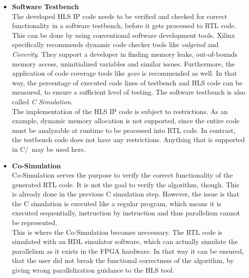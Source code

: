 \begin{itemize}
  \item \textbf{Software Testbench}\\
      The developed HLS IP code needs to be verified and checked for correct functionality in a software testbench, before it gets processed to RTL code.
      This can be done by using conventional software development tools.
      Xilinx specifically recommends dynamic code checker tools like \textit{valgrind} and \textit{Coverity}.
      They support a developer in finding memory leaks, out-of-bounds memory access, uninitialized variables and similar issues.
      Furthermore, the application of code coverage tools like \textit{gcov} is recommended as well.
      In that way, the percentage of executed code lines of testbench and HLS code can be measured, to ensure a sufficient level of testing.
      The software testbench is also called \textit{C Simulation}.\\

      The implementation of the HLS IP code is subject to restrictions.
      As an example, dynamic memory allocation is not supported, since the entire code must be analyzable at runtime to be processed into RTL code.
      In contrast, the testbench code does not have any restrictions.
      Anything that is supported in C/\cplusplus\ may be used here.\\

  \item \textbf{Co-Simulation}\\
      Co-Simulation serves the purpose to verify the correct functionality of the generated RTL code.
      It is not the goal to verify the algorithm, though.
      This is already done in the previous C simulation step.
      However, the issue is that the C simulation is executed like a regular program, which means it is executed sequentially, instruction by instruction and thus parallelism cannot be represented.\\

      This is where the Co-Simulation becomes neccessary.
      The RTL code is simulated with an HDL simulator software, which can actually simulate the parallelism as it exists in the FPGA hardware.
      In that way it can be ensured, that the user did not break the functional correctness of the algorithm, by giving wrong parallelization guidance to the HLS tool.\\


\end{itemize}
